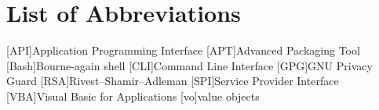 \chapter*{List of Abbreviations} 

\begin{acronym}
	
	[API]{Application Programming Interface}
	[APT]{Advanced Packaging Tool}
	[Bash]{Bourne-again shell}
	[CLI]{Command Line Interface}
	[GPG]{GNU Privacy Guard}
	[RSA]{Rivest–Shamir–Adleman}
	[SPI]{Service Provider Interface}
	[VBA]{Visual Basic for Applications}
	[vo]{value objects}
	
	
\end{acronym}